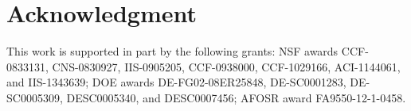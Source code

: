 \vspace{\sectionSpace}
\section*{Acknowledgment}
This work is supported in part by the following grants: NSF awards CCF-0833131, CNS-0830927, 
IIS-0905205, CCF-0938000, CCF-1029166, ACI-1144061, and IIS-1343639; DOE awards DE-FG02-08ER25848, 
DE-SC0001283, DE-SC0005309, DESC0005340, and DESC0007456; AFOSR award FA9550-12-1-0458.

